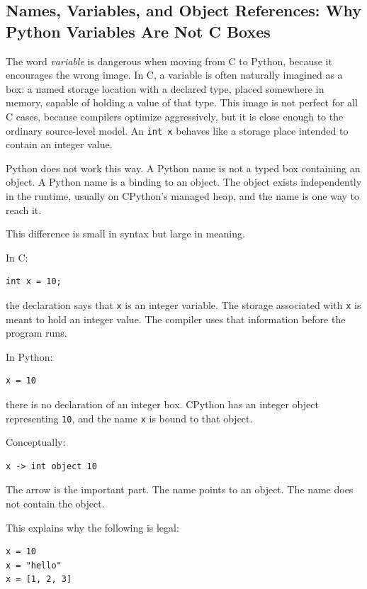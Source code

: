 \subsection{Names, Variables, and Object References: Why Python Variables Are Not C Boxes}

The word \emph{variable} is dangerous when moving from C to Python, because it encourages the wrong image. In C, a variable is often naturally imagined as a box: a named storage location with a declared type, placed somewhere in memory, capable of holding a value of that type. This image is not perfect for all C cases, because compilers optimize aggressively, but it is close enough to the ordinary source-level model. An \texttt{int x} behaves like a storage place intended to contain an integer value.

Python does not work this way. A Python name is not a typed box containing an object. A Python name is a binding to an object. The object exists independently in the runtime, usually on CPython's managed heap, and the name is one way to reach it.

This difference is small in syntax but large in meaning.

In C:

\begin{verbatim}
int x = 10;
\end{verbatim}

the declaration says that \texttt{x} is an integer variable. The storage associated with \texttt{x} is meant to hold an integer value. The compiler uses that information before the program runs.

In Python:

\begin{verbatim}
x = 10
\end{verbatim}

there is no declaration of an integer box. CPython has an integer object representing \texttt{10}, and the name \texttt{x} is bound to that object.

Conceptually:

\begin{verbatim}
x -> int object 10
\end{verbatim}

The arrow is the important part. The name points to an object. The name does not contain the object.

This explains why the following is legal:

\begin{verbatim}
x = 10
x = "hello"
x = [1, 2, 3]
\end{verbatim}

